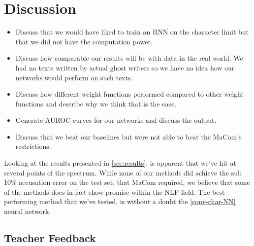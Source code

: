 \section{Discussion} 



\begin{itemize}

    \item

        Discuss that we would have liked to train an RNN on the character limit
        but that we did not have the computation power.

    \item

        Discuss how comparable our results will be with data in the real world.
        We had no texts written by actual ghost writers so we have no idea how
        our networks would perform on such texts.

    \item

        Discuss how different weight functions performed compared to other
        weight functions and describe why we think that is the case.

    \item

        Generate AUROC curves for our networks and discuss the output.

    \item

        Discuss that we beat our baselines but were not able to beat the MaCom's
        restrictions.

\end{itemize}

\label{sec:discussion} Looking at the results presented in \ref{sec:results},
is apparent that we've hit at several points of the spectrum. While none of our
methods did achieve the sub 10\% accusation error on the test set, that MaCom
required, we believe that some of the methods does in fact show promise within
the NLP field. The best performing method that we've tested, is without a doubt
the \ref{conv-char-NN} neural network. 

\subsection{Teacher Feedback}

